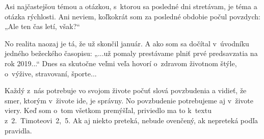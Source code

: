 








Asi najčastejšou témou a otázkou, s~ktorou sa posledné dni stretávam, je téma a otázka rýchlosti. Ani neviem, koľkokrát som za posledné obdobie počul povzdych: „Ale ten čas letí, však?“

No realita naozaj je tá, že už skončil január. A ako som sa dočítal v~úvodníku jedného bežeckého časopisu: „...už pomaly prestávame plniť prvé predsavzatia na rok 2019...“ Dnes sa skutočne veľmi veľa hovorí o~zdravom životnom štýle, o~výžive, stravovaní, športe...

Každý z~nás potrebuje vo svojom živote počuť slová povzbudenia a vidieť, že smer, ktorým v~živote ide, je správny. No povzbudenie potrebujeme aj v~živote viery. Keď som o~tom všetkom premýšľal, priviedlo ma to k~textu z~2.~Timoteovi~2,~5. Ak aj niekto preteká, nebude ovenčený, ak nepreteká podľa pravidla.

